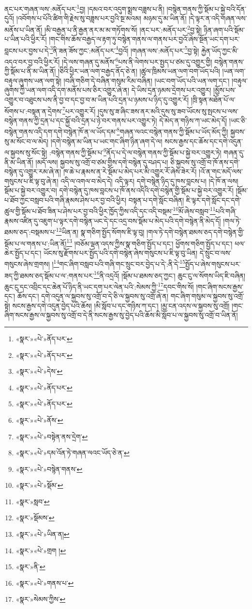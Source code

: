 ནང་པར་གཞན་ལས་:མནོད་པར་\footnote{«སྣར་»«པེ་»ནོད་པར་}བྱ། །དམའ་བར་འདུག་སྨྲས་བཟླས་པ་ནི། །བསྙེན་གནས་ཀྱི་སྡོམ་པ་སྐྱེ་བའི་དོན་དུའོ། །འབོགས་པ་པོའི་ཚིག་གི་རྗེས་སུ་བཟླས་པར་བྱའི་སྔ་མའམ། མཉམ་དུ་མ་ཡིན་ནོ། །དེ་ལྟར་ན་འདི་གཞན་ལས་མནོས་པ་ཡིན་ནོ། །མི་བརྒྱན་པ་ནི་རྒྱན་ནར་མ་མ་གཏོགས་སོ། །ནང་པར་:མནོད་པར་\footnote{«སྣར་»«པེ་»ནོད་པར་}བྱ་སྟེ། ཉིན་ཞག་པའི་སྡོམ་པ་ཡིན་པའི་ཕྱིར་རོ། །གང་གིས་ཆོས་བརྒྱད་ལ་རྟག་ཏུ་བསྙེན་གནས་ལ་གནས་པར་བྱའོ་ཞེས་སྔོན་ཡང་དག་པར་བླངས་པར་བྱས་པ་དེ་\footnote{«སྣར་»«པེ་»དེས་}ནི་ཟན་ཟོས་ཀྱང་:མནོད་པར་\footnote{«སྣར་»«པེ་»ནོད་པར་}བྱའོ། །གཞན་ལས་:མནོད་པར་\footnote{«སྣར་»«པེ་»ནོད་པར་}བྱ་སྟེ། རྐྱེན་ཡོད་ཀྱང་མི་འདའ་བར་བྱ་བའི་ཕྱིར་རོ། །དེ་ལས་གཞན་དུ་མནོས་\footnote{«སྣར་»«པེ་»ནོས་}པས་ནི་ལེགས་པར་སྤྱད་པ་ཙམ་དུ་འགྱུར་གྱི། བསྙེན་གནས་ཀྱི་སྡོམ་པ་ནི་མ་ཡིན་ནོ། །ཅིའི་ཕྱིར་ཡན་ལག་བརྒྱད་ནོད་ཅེ་ན། །ཚུལ་ཁྲིམས་ཡན་ལག་བག་ཡོད་པའི། །ཡན་ལག་བརྟུལ་ཞུགས་ཡན་ལག་སྟེ། །བཞི་གཅིག་དེ་བཞིན་གསུམ་རིམ་བཞིན། །ཡང་བག་ཡོད་པའི་ཡན་ལག་དང་། །བརྟུལ་ཞུགས་ཀྱི་ཡན་ལག་འདི་དག་མནོས་པས་ཅིར་འགྱུར་ཞེ་ན། དེ་ཡིས་དྲན་ཉམས་དྲེགས་པར་འགྱུར། །མྱོས་པས་འགྱུར་བ་འཐུངས་པས་ནི་བྱ་བ་དང་བྱ་བ་མ་ཡིན་པའི་དྲན་པ་ཉམས་པ་ཉིད་དུ་འགྱུར་རོ། །ཁྲི་སྟན་མཐོན་པོ་ལ་སོགས་པ་:བསྟན་ན་དྲེགས་\footnote{«སྣར་»«པེ་»བསྟེན་ནས་དྲེག་}པར་འགྱུར་རོ། །དུས་སུ་ཟ་ཞིང་ཟས་ནར་མའི་དུས་སུ་ཟབ་ཡོངས་སུ་སྤངས་པ་ལས་བསྙེན་གནས་ཀྱི་དྲན་པ་དང་སྐྱོ་བའི་དྲན་པ་ཉེ་བར་གནས་པར་འགྱུར་ཏེ། དེ་མེད་ན་གཉིས་ཀ་ཡང་མེད་དོ། །ཡང་ཅི་བསྙེན་གནས་འདི་དག་དགེ་བསྙེན་ཁོ་ན་ལ་ཡོད་དམ་\footnote{«སྣར་»«པེ་»དམ་འོན་ཏེ་གཞན་ལའང་ཡོད་ཅེ་ན་}གཞན་ལའང་བསྙེན་གནས་ཀྱི་སྡོམ་པ་ཡོད་མོད་ཀྱི། སྐྱབས་སུ་མ་སོང་བ་ལ་མེད། །དགེ་བསྙེན་མ་ཡིན་པ་ཡང་གང་ཞིག་ཉིན་ཞག་དེ་ལ། སངས་རྒྱས་དང་ཆོས་དང་དགེ་འདུན་ལ་སྐྱབས་སུ་སོང་སྟེ། :བསྙེན་གནས་ཀྱི་སྡོམ་པ་\footnote{«སྣར་»«པེ་»བསྙེན་གནས་}ནོད་པ་དེ་ལ་བསྙེན་གནས་ཀྱི་སྡོམ་པ་སྐྱེ་བར་འགྱུར་ཏེ། གཞན་དུ་ནི་མ་ཡིན་ནོ། །མདོ་ལས། སྐྱབས་སུ་འགྲོ་བ་ཙམ་གྱིས་དགེ་བསྙེན་དུ་བཤད་པ། ཅི་སྐྱབས་སུ་འགྲོ་བ་ཁོ་ནས་དགེ་བསྙེན་དུ་འགྱུར་རམ་ཞེ་ན། ཁ་ཆེ་པ་རྣམས་ན་རེ་སྡོམ་པ་མེད་པར་མི་འགྱུར་རོ་ཞེས་ཟེར་རོ། །འོ་ན་གང་མདོ་ལས་གསུངས་པ་ཇི་ལྟ་བུ་ཞེ་ན། འདི་ལ་འགལ་བ་མེད་དེ། འདི་ལྟར། དགེ་བསྙེན་ཉིད་དུ་ཁས་བླངས་པ། །དེ་ཁོ་ན་ལས། སྡོམ་པ་སྐྱེ་བར་འགྱུར་བ། དགེ་བསྙེན་དུ་ཁས་བླངས་པ་ཁོ་ནས་འདིའི་དགེ་བསྙེན་གྱི་སྡོམ་པ་སྐྱེ་བར་འགྱུར་རོ། །སྡོམ་པ་ཐོབ་ཀྱང་བསླབ་པའི་གཞི་རྣམས་ཤེས་པར་བྱ་བའི་ཕྱིར། བསྟན་པ་དགེ་སློང་བཞིན། ཇི་ལྟར་དགེ་སློང་དང་དགེ་ཚུལ་གྱི་སྡོམ་པ་ཐོབ་ཟིན་པ་ཤེས་པར་བྱ་བའི་ཕྱིར་ཁྱོད་ཀྱིས་འདི་དང་འདི་བསྡམ་\footnote{«སྣར་»«པེ་»སྡོམ་}མོ་ཞེས་བསླབ་\footnote{«སྣར་»སླབ་}པའི་གཞི་རྣམས་འཛིན་དུ་འཇུག་པ་ལྟར་དགེ་བསྙེན་ཡང་དེ་དང་འདྲ་བས་སྡོམ་པ་མེད་པའི་དགེ་བསྙེན་ནི་མེད་དོ། །གལ་ཏེ་ཐམས་ཅད་:བསྡམས་པ་\footnote{«སྣར་»སྡོམས་}ཡིན་ན། སྣ་གཅིག་སྤྱོད་སོགས་ཇི་ལྟ་བུ། །གལ་ཏེ་དགེ་བསྙེན་ཐམས་ཅད་དགེ་བསྙེན་གྱི་སྡོམ་པ་ལ་གནས་པ་:ཡིན་ནོ།\footnote{«སྣར་»«པེ་»ཡིན་ན།} །བཅོམ་ལྡན་འདས་ཀྱིས་སྣ་གཅིག་སྤྱོད་པ་དང་། ཕྱོགས་གཅིག་སྤྱོད་པ་དང་། ཕལ་ཆེར་སྤྱོད་པ་དང་། ཡོངས་སུ་རྫོགས་པར་སྤྱོད་པའི་དགེ་བསྙེན་ཞེས་གསུངས་པ་ཇི་ལྟ་བུ་ཡིན། དེ་སྲུང་བ་ལས་གསུངས་ཞེས་གྲགས། །\footnote{«སྣར་»«པེ་»གྲག །}གང་ཞིག་བསླབ་པའི་གཞི་གང་སྲུང་བར་བྱེད་པ་དེ་:ནི་དེ་\footnote{«སྣར་»ནི་}སྤྱོད་པ་ཞེས་གསུངས་པར་ཟད་ཀྱི་ཐམས་ཅད་སྡོམ་པ་ལ་:གནས་པར་\footnote{«སྣར་»«པེ་»གནས་པ་}ནི་འདྲའོ། །སྡོམ་པ་ཐམས་ཅད་ཀྱང་། ཆུང་ངུ་ལ་སོགས་ཡིད་ཇི་བཞིན། ཆུང་ངུ་དང་འབྲིང་དང་ཆེན་པོ་ཉིད་ནི་ཡང་དག་པར་ལེན་པའི་:སེམས་ཀྱི་\footnote{«སྣར་»སེམས་ཀྱིས་}དབང་གིས་སོ། །གང་ཞིག་སངས་རྒྱས་དང་། ཆོས་དང་། དགེ་འདུན་ལ་སྐྱབས་སུ་འགྲོ་བ་དེ་ཅི་ལ་སྐྱབས་སུ་འགྲོ་ཞེ་ན། གང་ཞིག་གསུམ་ལ་སྐྱབས་སུ་འགྲོ་སྟེ། སངས་རྒྱས་དགེ་འདུན་བྱེད་པའི་ཆོས། །མི་སློབ་པ་དང་གཉིས་ཀ་དང་། །མྱ་ངན་འདས་ལ་སྐྱབས་སུ་འགྲོ། །གང་ཞིག་སངས་རྒྱས་ལ་སྐྱབས་སུ་འགྲོ་བ་དེ་ནི་སངས་རྒྱས་སུ་བྱེད་པའི་ཆོས་མི་སློབ་པ་ལ་སྐྱབས་སུ་འགྲོ་བ་ཡིན་ནོ། 